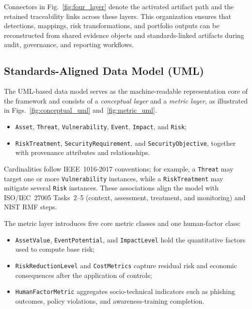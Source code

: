 \documentclass[preprint,12pt]{elsarticle}
\begin{document}
Connectors in Fig.~\ref{fig:four_layer} denote the activated artifact path and the retained traceability links across these layers. This organization ensures that detections, mappings, risk transformations, and portfolio outputs can be reconstructed from shared evidence objects and standards-linked artifacts during audit, governance, and reporting workflows.
\subsection{Standards-Aligned Data Model (UML)}
\label{sec:uml}
The UML-based data model serves as the machine-readable representation core of the framework and consists of a \emph{conceptual layer} and a \emph{metric layer}, as illustrated in Figs.~\ref{fig:conceptual_uml} and~\ref{fig:metric_uml}.

\begin{itemize}[leftmargin=*]
  \item \texttt{Asset}, \texttt{Threat}, \texttt{Vulnerability}, \texttt{Event}, \texttt{Impact}, and \texttt{Risk};
  \item \texttt{RiskTreatment}, \texttt{SecurityRequirement}, and \texttt{SecurityObjective}, together with provenance attributes and relationships.
\end{itemize}

Cardinalities follow IEEE~1016-2017 conventions; for example, a \texttt{Threat} may target one or more \texttt{Vulnerability} instances, while a \texttt{RiskTreatment} may mitigate several \texttt{Risk} instances. These associations align the model with ISO/IEC~27005 Tasks~2--5 (context, assessment, treatment, and monitoring) and NIST RMF steps.

The metric layer introduces five core metric classes and one human-factor class:

\begin{itemize}[leftmargin=*]
  \item \texttt{AssetValue}, \texttt{EventPotential}, and \texttt{ImpactLevel} hold the quantitative factors used to compute base risk;
  \item \texttt{RiskReductionLevel} and \texttt{CostMetrics} capture residual risk and economic consequences after the application of controls;
  \item \texttt{HumanFactorMetric} aggregates socio-technical indicators such as phishing outcomes, policy violations, and awareness-training completion.
\end{itemize}
\end{document}
